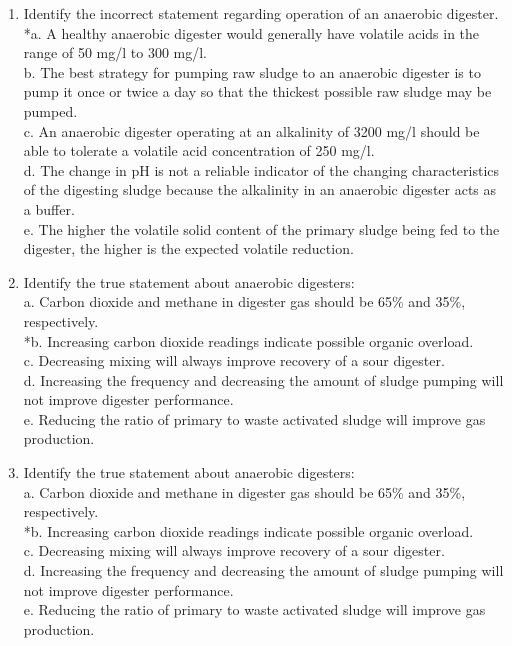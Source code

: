 \documentclass{article}
\begin{document}
\begin{enumerate}
\item  Identify the incorrect statement regarding operation of an anaerobic digester. \\

*a. A healthy anaerobic digester would generally have volatile acids in the range of 50 mg/l to 300 mg/l. \\
b. The best strategy for pumping raw sludge to an anaerobic digester is to pump it once or twice a day so that the thickest possible raw sludge may be pumped. \\
c. An anaerobic digester operating at an alkalinity of 3200 mg/l should be able to tolerate a volatile acid concentration of 250 mg/l. \\
d. The change in pH is not a reliable indicator of the changing characteristics of the digesting sludge because the alkalinity in an anaerobic digester acts as a buffer. \\
e. The higher the volatile solid content of the primary sludge being fed to the digester, the higher is the expected volatile reduction. \\

\item  Identify the true statement about anaerobic digesters: \\

a. Carbon dioxide and methane in digester gas should be 65\% and 35\%, respectively. \\
*b. Increasing carbon dioxide readings indicate possible organic overload. \\
c. Decreasing mixing will always improve recovery of a sour digester. \\
d. Increasing the frequency and decreasing the amount of sludge pumping will not improve digester performance. \\
e. Reducing the ratio of primary to waste activated sludge will improve gas production. \\

\item  Identify the true statement about anaerobic digesters: \\

a. Carbon dioxide and methane in digester gas should be 65\% and 35\%, respectively. \\
*b. Increasing carbon dioxide readings indicate possible organic overload. \\
c. Decreasing mixing will always improve recovery of a sour digester. \\
d. Increasing the frequency and decreasing the amount of sludge pumping will not improve digester performance. \\
e. Reducing the ratio of primary to waste activated sludge will improve gas production. \\


\end{enumerate}
\end{document}
